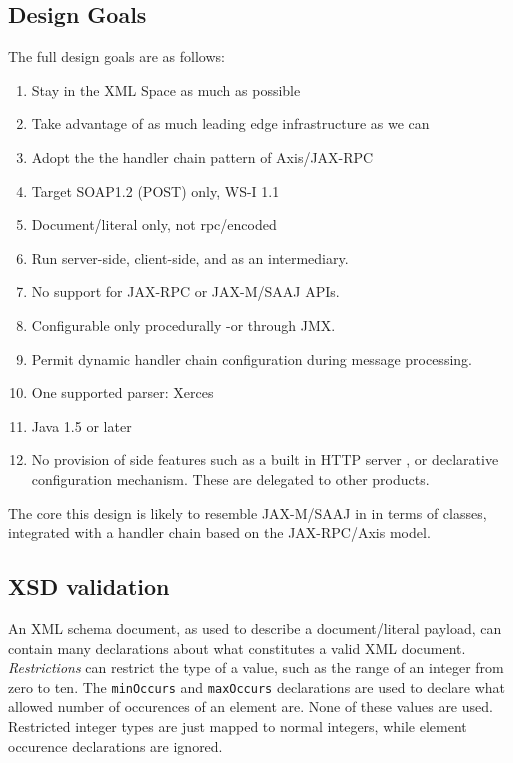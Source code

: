 \subsection{Design Goals}
\label{alpine:design}

The full design goals are as follows:

\begin{enumerate}

\item Stay in the XML Space as much as possible
\item Take advantage of as much leading edge infrastructure as we can
\item Adopt the the handler chain pattern of Axis/JAX-RPC
\item Target SOAP1.2 (POST) only, WS-I 1.1
\item Document/literal only, not rpc/encoded
\item Run server-side, client-side, and as an intermediary. 
\item No support for JAX-RPC or JAX-M/SAAJ APIs.
\item Configurable only procedurally -or through JMX.
\item Permit dynamic handler chain configuration during message processing.
\item One supported parser: Xerces
\item Java 1.5 or later 

\item No provision of side features such as a built in HTTP server , or
declarative configuration mechanism. These are delegated to other products.
\end{enumerate}

The core this design is likely to resemble JAX-M/SAAJ in in terms of classes,
integrated with a handler chain based on the JAX-RPC/Axis model.  


\subsection{XSD validation}
\label{alpine:validation}
An XML schema document, as used to describe a document/literal
payload, can contain many declarations about what constitutes a valid
XML document. \emph{Restrictions} can restrict the type of a value,
such as the range of an integer from zero to ten. The \verb|minOccurs|
and \verb|maxOccurs| declarations are used to declare what allowed
number of occurences of an element are. None of these values are
used. Restricted integer types are just mapped to normal integers,
while element occurence declarations are ignored.

